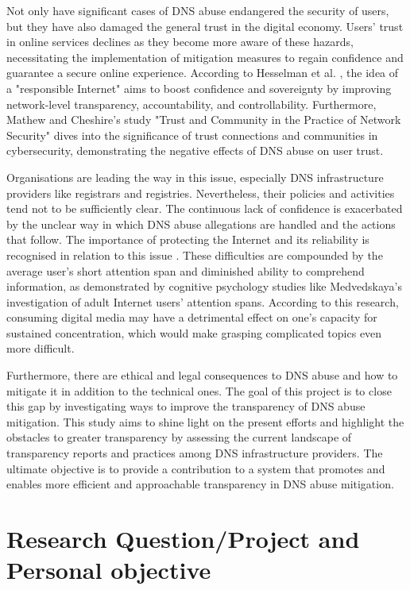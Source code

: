 Not only have significant cases of DNS abuse endangered the security of users, but they have also damaged the general trust in the digital economy. Users' trust in online services declines as they become more aware of these hazards, necessitating the implementation of mitigation measures to regain confidence and guarantee a secure online experience. According to Hesselman et al. \cite{hesselman2020}, the idea of a "responsible Internet" aims to boost confidence and sovereignty by improving network-level transparency, accountability, and controllability. Furthermore, Mathew and Cheshire's \cite{mathew2016} study "Trust and Community in the Practice of Network Security" dives into the significance of trust connections and communities in cybersecurity, demonstrating the negative effects of DNS abuse on user trust.

Organisations are leading the way in this issue, especially DNS infrastructure providers like registrars and registries. Nevertheless, their policies and activities tend not to be sufficiently clear. The continuous lack of confidence is exacerbated by the unclear way in which DNS abuse allegations are handled and the actions that follow. The importance of protecting the Internet and its reliability is recognised in relation to this issue \cite{cerf2022}. These difficulties are compounded by the average user's short attention span and diminished ability to comprehend information, as demonstrated by cognitive psychology studies like Medvedskaya's \cite{medvedskaya2022} investigation of adult Internet users' attention spans. According to this research, consuming digital media may have a detrimental effect on one's capacity for sustained concentration, which would make grasping complicated topics even more difficult.

Furthermore, there are ethical and legal consequences to DNS abuse and how to mitigate it in addition to the technical ones. The goal of this project is to close this gap by investigating ways to improve the transparency of DNS abuse mitigation. This study aims to shine light on the present efforts and highlight the obstacles to greater transparency by assessing the current landscape of transparency reports and practices among DNS infrastructure providers. The ultimate objective is to provide a contribution to a system that promotes and enables more efficient and approachable transparency in DNS abuse mitigation.


\section{Research Question/Project and Personal objective} 
